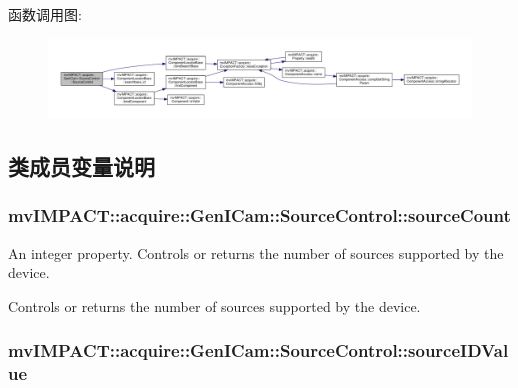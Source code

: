 函数调用图\+:
\nopagebreak
\begin{figure}[H]
\begin{center}
\leavevmode
\includegraphics[width=350pt]{classmv_i_m_p_a_c_t_1_1acquire_1_1_gen_i_cam_1_1_source_control_a903a4942b9a702640f4554df8fc0c475_cgraph}
\end{center}
\end{figure}




\subsection{类成员变量说明}
\hypertarget{classmv_i_m_p_a_c_t_1_1acquire_1_1_gen_i_cam_1_1_source_control_a098ebb10aed503b6165aac8af7df0c2a}{
\subsubsection[{source\+Count}]{ mv\+I\+M\+P\+A\+C\+T\+::acquire\+::\+Gen\+I\+Cam\+::\+Source\+Control\+::source\+Count}}\label{classmv_i_m_p_a_c_t_1_1acquire_1_1_gen_i_cam_1_1_source_control_a098ebb10aed503b6165aac8af7df0c2a}


An integer property. Controls or returns the number of sources supported by the device. 

Controls or returns the number of sources supported by the device. \hypertarget{classmv_i_m_p_a_c_t_1_1acquire_1_1_gen_i_cam_1_1_source_control_af68d602d042f8caa1f962cd7c178d598}{
\subsubsection[{source\+I\+D\+Value}]{ mv\+I\+M\+P\+A\+C\+T\+::acquire\+::\+Gen\+I\+Cam\+::\+Source\+Control\+::source\+I\+D\+Value}}\label{classmv_i_m_p_a_c_t_1_1acquire_1_1_gen_i_cam_1_1_source_control_af68d602d042f8caa1f962cd7c178d598}


